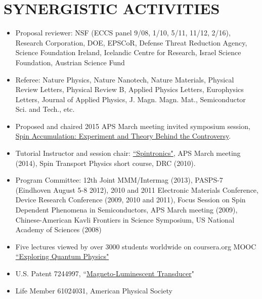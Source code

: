 \documentclass[paper=letter,fontsize=11pt]{scrartcl} %
\newcommand{\NewPart}[2]{\section*{\uppercase{#1} #2}}
\begin{document}
\NewPart{Synergistic Activities}{}
\begin{itemize}
\item Proposal reviewer: NSF (ECCS panel 9/08, 1/10, 5/11, 11/12, 2/16), Research Corporation, DOE, EPSCoR, Defense Threat Reduction Agency, Science Foundation Ireland, Icelandic Centre for Research, Israel Science Foundation, Austrian Science Fund
\item Referee: Nature Physics, Nature Nanotech, Nature Materials, Physical Review Letters, Physical Review B, Applied Physics Letters, Europhysics Letters, Journal of Applied Physics, J. Magn. Magn. Mat., Semiconductor Sci. and Tech., etc.
\item Proposed and chaired 2015 APS March meeting invited symposium session, \href{http://meeting.aps.org/Meeting/MAR15/Session/Y20}{Spin Accumulation: Experiment and Theory Behind the Controversy}.
\item Tutorial Instructor and session chair: \href{http://appelbaum.physics.umd.edu/docs/ppt/Appelbaum_102414.pdf}{``Spintronics"}, APS March meeting (2014), Spin Transport Physics short course, DRC (2010).
\item Program Committee: 12th Joint MMM/Intermag (2013), PASPS-7 (Eindhoven August 5-8 2012), 2010 and 2011 Electronic Materials Conference, Device Research Conference (2009, 2010 and 2011), Focus Session on Spin Dependent Phenomena in Semiconductors, APS March meeting (2009), Chinese-American Kavli Frontiers in Science Symposium, US National Academy of Sciences (2008)
\item Five lectures viewed by over 3000 students worldwide on coursera.org MOOC \href{https://www.coursera.org/course/eqp}{``Exploring Quantum Physics"}
\item U.S. Patent 7244997, ``\href{http://www.google.com/patents/US7244997}{Magneto-Luminescent Transducer}"
\item Life Member 61024031, American Physical Society
\end{itemize}
\end{document}
